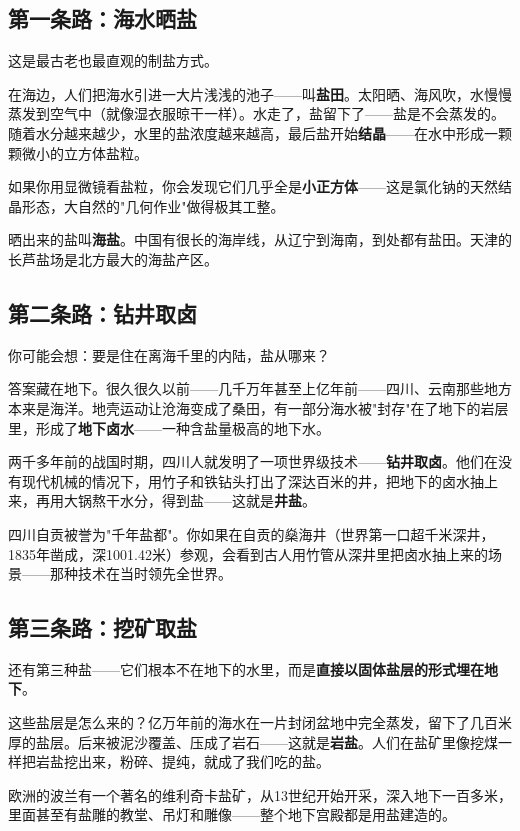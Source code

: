 \documentclass[a4paper,12pt]{ctexart}
\begin{document}
\subsection*{第一条路：海水晒盐}

这是最古老也最直观的制盐方式。

在海边，人们把海水引进一大片浅浅的池子——叫\textbf{盐田}。太阳晒、海风吹，水慢慢蒸发到空气中（就像湿衣服晾干一样）。水走了，盐留下了——盐是不会蒸发的。随着水分越来越少，水里的盐浓度越来越高，最后盐开始\textbf{结晶}——在水中形成一颗颗微小的立方体盐粒。

如果你用显微镜看盐粒，你会发现它们几乎全是\textbf{小正方体}——这是氯化钠的天然结晶形态，大自然的"几何作业"做得极其工整。

晒出来的盐叫\textbf{海盐}。中国有很长的海岸线，从辽宁到海南，到处都有盐田。天津的长芦盐场是北方最大的海盐产区。

\subsection*{第二条路：钻井取卤}

你可能会想：要是住在离海千里的内陆，盐从哪来？

答案藏在地下。很久很久以前——几千万年甚至上亿年前——四川、云南那些地方本来是海洋。地壳运动让沧海变成了桑田，有一部分海水被"封存"在了地下的岩层里，形成了\textbf{地下卤水}——一种含盐量极高的地下水。

两千多年前的战国时期，四川人就发明了一项世界级技术——\textbf{钻井取卤}。他们在没有现代机械的情况下，用竹子和铁钻头打出了深达百米的井，把地下的卤水抽上来，再用大锅熬干水分，得到盐——这就是\textbf{井盐}。

四川自贡被誉为"千年盐都"。你如果在自贡的燊海井（世界第一口超千米深井，1835年凿成，深1001.42米）参观，会看到古人用竹管从深井里把卤水抽上来的场景——那种技术在当时领先全世界。

\subsection*{第三条路：挖矿取盐}

还有第三种盐——它们根本不在地下的水里，而是\textbf{直接以固体盐层的形式埋在地下}。

这些盐层是怎么来的？亿万年前的海水在一片封闭盆地中完全蒸发，留下了几百米厚的盐层。后来被泥沙覆盖、压成了岩石——这就是\textbf{岩盐}。人们在盐矿里像挖煤一样把岩盐挖出来，粉碎、提纯，就成了我们吃的盐。

欧洲的波兰有一个著名的维利奇卡盐矿，从13世纪开始开采，深入地下一百多米，里面甚至有盐雕的教堂、吊灯和雕像——整个地下宫殿都是用盐建造的。
\end{document}
